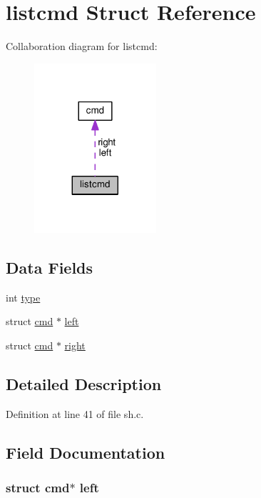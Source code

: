 \hypertarget{structlistcmd}{\section{listcmd Struct Reference}
\label{structlistcmd}
}


Collaboration diagram for listcmd\-:
\nopagebreak
\begin{figure}[H]
\begin{center}
\leavevmode
\includegraphics[width=128pt]{structlistcmd__coll__graph}
\end{center}
\end{figure}
\subsection*{Data Fields}
\begin{DoxyCompactItemize}
\item 
int \hyperlink{structlistcmd_ac765329451135abec74c45e1897abf26}{type}
\item 
struct \hyperlink{structcmd}{cmd} $\ast$ \hyperlink{structlistcmd_a69f2fa418c6e61f8b6b4e44f12a3ab4b}{left}
\item 
struct \hyperlink{structcmd}{cmd} $\ast$ \hyperlink{structlistcmd_ab5429c86b9ebd1279ea5674110a2190b}{right}
\end{DoxyCompactItemize}


\subsection{Detailed Description}


Definition at line 41 of file sh.\-c.



\subsection{Field Documentation}
\hypertarget{structlistcmd_a69f2fa418c6e61f8b6b4e44f12a3ab4b}{
\subsubsection[{left}]{\setlength{\rightskip}{0pt plus 5cm}struct {\bf cmd}$\ast$ left}}\label{structlistcmd_a69f2fa418c6e61f8b6b4e44f12a3ab4b}


